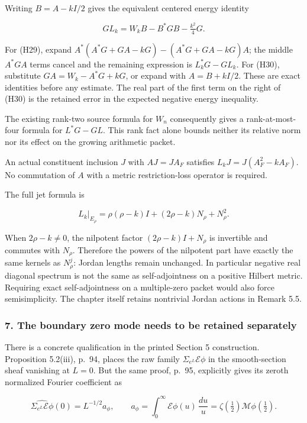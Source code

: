 Writing \(B=A-kI/2\) gives the equivalent centered energy identity

\[
\boxed{GL_k=W_kB-B^*GB-\tfrac{k^2}{4}G.}
\tag{H30}
\]

For (H29), expand \(A^*(A^*G+GA-kG)-(A^*G+GA-kG)A\); the middle \(A^*GA\) terms cancel and the remaining expression is \(L_k^*G-GL_k\). For (H30), substitute \(GA=W_k-A^*G+kG\), or expand with \(A=B+kI/2\). These are exact identities before any estimate. The real part of the first term on the right of (H30) is the retained error in the expected negative energy inequality.

The existing rank-two source formula for \(W_n\) consequently gives a rank-at-most-four formula for \(L^*G-GL\). This rank fact alone bounds neither its relative norm nor its effect on the growing arithmetic packet.

An actual constituent inclusion \(J\) with \(AJ=JA_F\) satisfies \(L_kJ=J(A_F^2-kA_F)\). No commutation of \(A\) with a metric restriction-loss operator is required.

The full jet formula is

\[
\boxed{L_k|_{E_\rho}=\rho(\rho-k)I+(2\rho-k)N_\rho+N_\rho^2.}
\tag{H31}
\]

When \(2\rho-k\ne0\), the nilpotent factor \((2\rho-k)I+N_\rho\) is invertible and commutes with \(N_\rho\). Therefore the powers of the nilpotent part have exactly the same kernels as \(N_\rho^j\): Jordan lengths remain unchanged. In particular negative real diagonal spectrum is not the same as self-adjointness on a positive Hilbert metric. Requiring exact self-adjointness on a multiple-zero packet would also force semisimplicity. The chapter itself retains nontrivial Jordan actions in Remark 5.5.

\subsubsection{7. The boundary zero mode needs to be retained separately}\label{endpoint-cc_hochschild--the-boundary-zero-mode-needs-to-be-retained-separately}

There is a concrete qualification in the printed Section 5 construction. Proposition 5.2(iii), p.~94, places the raw family \(\Sigma_{e^L}\mathcal E\phi\) in the smooth-section sheaf vanishing at \(L=0\). But the same proof, p.~95, explicitly gives its zeroth normalized Fourier coefficient as

\[
\widehat{\Sigma_{e^L}\mathcal E\phi}(0)
=L^{-1/2}a_\phi,\qquad
a_\phi=\int_0^\infty\mathcal E\phi(u)\,\frac{du}{u}
=\zeta(\tfrac12)\mathcal M\phi(\tfrac12).
\tag{H32}
\]

